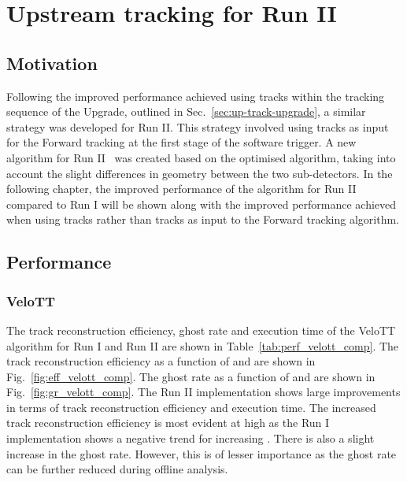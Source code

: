\section{Upstream tracking for \lhcb Run II}
\label{sec:up-track-run2}

\subsection{Motivation}

Following the improved performance achieved using \velout tracks within the tracking sequence of the \lhcb Upgrade, outlined in Sec.~\ref{sec:up-track-upgrade}, a similar strategy was developed for \lhcb Run II. This strategy involved using \velott tracks as input for the Forward tracking at the first stage of the software trigger. A new \velott algorithm for Run II~\cite{velott} was created based on the optimised \velout algorithm, taking into account the slight differences in geometry between the two sub-detectors. In the following chapter, the improved performance of the \velott algorithm for Run II compared to Run I will be shown along with the improved performance achieved when using \velott tracks rather than \velo tracks as input to the Forward tracking algorithm.

\subsection{Performance}

\subsubsection{VeloTT}

The track reconstruction efficiency, ghost rate and execution time of the VeloTT algorithm for Run I and Run II are shown in Table~\ref{tab:perf_velott_comp}. The track reconstruction efficiency as a function of \ptot and \pt are shown in Fig.~\ref{fig:eff_velott_comp}. The ghost rate as a function of \ptot and \pt are shown in Fig.~\ref{fig:gr_velott_comp}. The Run II implementation shows large improvements in terms of track reconstruction efficiency and execution time. The increased track reconstruction efficiency is most evident at high \ptot as the Run I implementation shows a negative trend for increasing \ptot. There is also a slight increase in the ghost rate. However, this is of lesser importance as the ghost rate can be further reduced during offline analysis. 

